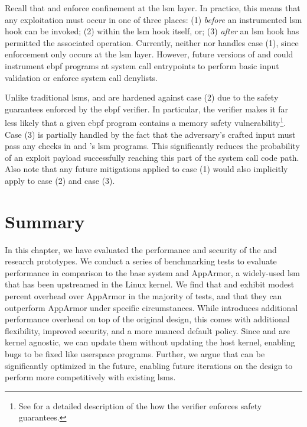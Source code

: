 Recall that \bpfbox{} and \bpfcontain{} enforce confinement at the \gls{lsm} layer.  In
practice, this means that any exploitation must occur in one of three places: (1)
\textit{before} an instrumented \gls{lsm} hook can be invoked; (2) within the \gls{lsm}
hook itself, or; (3) \textit{after} an \gls{lsm} hook has permitted the associated
operation. Currently, neither \bpfbox{} nor \bpfcontain{} handles case (1), since
enforcement only occurs at the \gls{lsm} layer. However, future versions of \bpfbox{} and
\bpfcontain{} could instrument \gls{ebpf} programs at system call entrypoints to perform
basic input validation or enforce system call denylists.

Unlike traditional \glspl{lsm}, \bpfbox{} and \bpfcontain{} are hardened against case (2)
due to the safety guarantees enforced by the \gls{ebpf} verifier. In particular, the
verifier makes it far less likely that a given \gls{ebpf} program contains a memory safety
vulnerability\footnote{See  for a detailed description of the how the
verifier enforces safety guarantees.}. Case (3) is partially handled by the fact that the
adversary's crafted input must pass any checks in \bpfbox{} and \bpfcontain{}'s \gls{lsm}
programs.  This significantly reduces the probability of an exploit payload successfully
reaching this part of the system call code path. Also note that any future mitigations
applied to case (1) would also implicitly apply to case (2) and case (3).

\section{Summary}%
\label{s:eval-summary}

In this chapter, we have evaluated the performance and security of the \bpfbox{} and
\bpfcontain{} research prototypes. We conduct a series of benchmarking tests to evaluate
performance in comparison to the base system and AppArmor, a widely-used \gls{lsm} that
has been upstreamed in the Linux kernel. We find that \bpfbox{} and \bpfcontain{} exhibit
modest percent overhead over AppArmor in the majority of tests, and that they can
outperform AppArmor under specific circumstances. While \bpfcontain{} introduces
additional performance overhead on top of the original \bpfbox{} design, this comes with
additional flexibility, improved security, and a more nuanced default policy. Since
\bpfbox{} and \bpfcontain{} are kernel agnostic, we can update them without updating the
host kernel, enabling bugs to be fixed like userspace programs. Further, we argue that
\bpfcontain{} can be significantly optimized in the future, enabling future iterations on
the design to perform more competitively with existing \glspl{lsm}.

